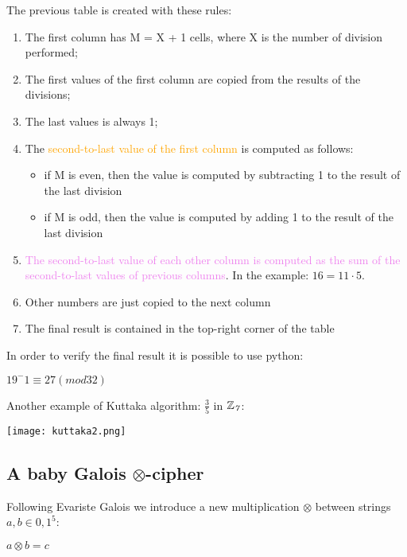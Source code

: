 \documentclass{article}
\begin{document}
The previous table is created with these rules:
\begin{enumerate}
    \item The first column has M = X + 1 cells, where X is the number of division performed;
    \item The first values of the first column are copied from the results of the divisions;
    \item The last values is always 1;
    \item The \textcolor{orange}{second-to-last value of the first column} is computed as follows:
    \begin{itemize}
        \item if M is even, then the value is computed by subtracting 1 to the \textcolor{myDarkGreen}{result of the last division}
        \item if M is odd, then the value is computed by adding 1 to the \textcolor{myDarkGreen}{result of the last division}
    \end{itemize}
    
    \item \textcolor{violet}{The second-to-last value of each other column is computed as the sum of the second-to-last values of previous columns}. In the example: $16 = 11 \cdot 5$.
    \item Other numbers are just copied to the next column
    \item The final result is contained in the top-right corner of the table
\end{enumerate}

In order to verify the final result it is possible to use python:
\begin{center}
    $19^-1 \equiv 27 (mod 32)$
\end{center}

Another example of Kuttaka algorithm: $\frac{3}{5}$  in           $\mathbb{Z}\textsubscript{\textit{7}}$:

\begin{center}
\texttt{[image: kuttaka2.png]}
\end{center}



\subsection{A baby Galois $\otimes$-cipher}
Following Evariste Galois we introduce a new multiplication $\otimes$ between strings $a,b \in {0,1}^5$:

\begin{center}
    $a \otimes b = c$
\end{center}
\end{document}
